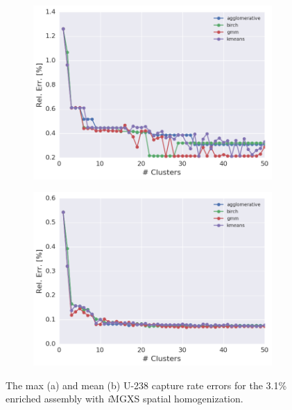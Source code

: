 \begin{figure}[h!]
\centering
\begin{subfigure}{0.9\textwidth}
  \centering
  \includegraphics[width=\linewidth]{figures/results/err-by-cluster/assm-31/max-rel-err}
  \caption{}
  \label{fig:chap11-max-capt-err-by-cluster-assm-31}
\end{subfigure}
\begin{subfigure}{0.9\textwidth}
  \centering
  \includegraphics[width=\linewidth]{figures/results/err-by-cluster/assm-31/mean-rel-err}
  \caption{}
  \label{fig:chap11-mean-capt-err-by-cluster-assm-31}
\end{subfigure}
\caption[U-238 capture error for the 3.1\% enriched assembly]{The max (a) and mean (b) U-238 capture rate errors for the 3.1\% enriched assembly with \textit{i}\ac{MGXS} spatial homogenization.}
\label{fig:chap11-capt-err-by-cluster-assm-31}
\end{figure}

